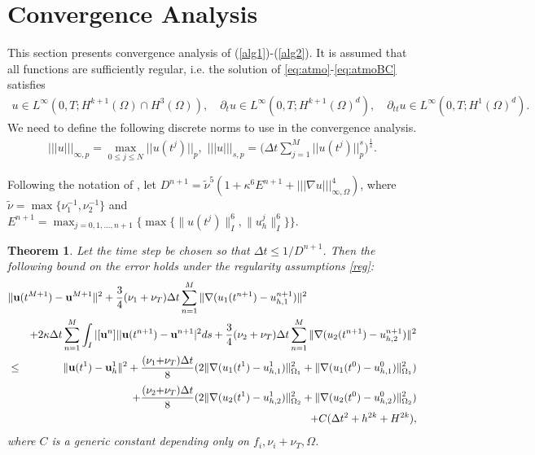 \documentclass[10pt]{article}%
\numberwithin{equation}{section}
\newtheorem{theorem}{Theorem}[section]
\begin{document}
\section{Convergence Analysis }
This section presents convergence analysis of (\ref{alg1})-(\ref{alg2}). It is assumed that all functions are sufficiently regular, i.e. the solution of \eqref{eq:atmo}-\eqref{eq:atmoBC} satisfies
\begin{eqnarray}
u \in{L^\infty(0,T;H^{k+1}(\Omega) \cap H^3(\Omega) )}, \quad
\partial_t u \in{L^\infty(0,T;H^{k+1}(\Omega)^d)}\label{reg},\quad \partial_{tt} u\in{L^\infty(0,T;H^{1}(\Omega)^d)} \label{r}.
\end{eqnarray}
We need to define the following discrete norms to use in the convergence analysis.
\begin{eqnarray}
|||u|||_{\infty,p}=\max\limits_{0\leq j \leq N}||u(t^j)||_p, \, \, |||u|||_{s,p}=\Big(\Delta t \sum\limits_{j=1}^{M}||u(t^j)||_p^s \Big)^{\frac{1}{s}}.
\end{eqnarray}


{Following the notation of \cite{CHL12}, let $D^{n+1} = \tilde{\nu}^5(1+\kappa^6E^{n+1}+|||\nabla u|||_{\infty,\Omega}^4)$, where $\tilde{\nu} = \max\{\nu^{-1}_1,\nu^{-1}_2\}$ and $E^{n+1} = \max_{j=0,1,...,n+1}\{\max\{\|u(t^j)\|^6_I,\|u_h^j\|^6_I\}\}$.}


\begin{theorem}\label{The:conv} { Let the time step be chosen so that $\Delta t \le 1/D^{n+1}$. Then the following bound on the error holds under the regularity assumptions \eqref{reg}:}
	\begin{eqnarray}
	\lefteqn{\|{\bf u}(t^{{M}+1})-{\bf u}^{{M}+1}\|^2  +{ \frac{3}{4}(\nu_1+\nu_T)\Delta t\sum_{n=1}^{M}\|\nabla  (u_1(t^{n+1})-u_{h,1}^{n+1})\|^2}}\nonumber\\&&+2\kappa\Delta t \sum_{n=1}^{M}\int_{I}|[{\bf u}^n]|  |{\bf u}(t^{n+1})-{\bf u}^{n+1}|^2ds +{ \frac{3}{4}(\nu_2+\nu_T)\Delta t\sum_{n=1}^{M}\|\nabla  (u_2(t^{n+1})-u_{h,2}^{n+1})\|^2}
	\nonumber\\&\leq& \|{\bf u}(t^{1})-{\bf u}_h^{1}\|^2+\frac{(\nu_1{ +\nu_T})\Delta t}{8}(2\|\nabla({ u_1}(t^{1})-u_{h,1}^{1})\|^2_{\Omega_1}+\|\nabla ({ u_1}(t^{0})-u_{h,1}^{0})\|^2_{\Omega_1})\nonumber\\[3pt]&&+\frac{(\nu_2{ +\nu_T})\Delta t}{8}(2\|\nabla({ u_{2}}(t^{1})-{u_{h,2}^{1}})\|^2_{\Omega_2}+\|\nabla ({ u_2}(t^{0})-u_{h,2}^{0})\|^2_{\Omega_2})\nonumber\\&&+C(\Delta t^2+h^{2k}+H^{2k}),\label{thm}
	\end{eqnarray}
	where $C$ is a generic constant depending only on ${f_i},{\nu_i+\nu_T},\Omega$.
\end{theorem}
\end{document}
